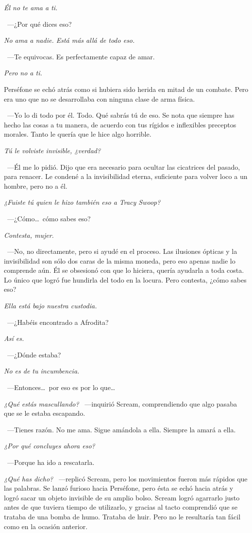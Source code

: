 \emph{Él no te ama a ti.}

~---¿Por qué dices eso?

\emph{No ama a nadie. Está más allá de todo eso.}

~---Te equivocas. Es perfectamente capaz de amar.

\emph{Pero no a ti.}

Perséfone se echó atrás como si hubiera sido herida en mitad de un combate. Pero era uno que no se desarrollaba con ninguna clase de arma física.

~---Yo lo di todo por él. Todo. Qué sabrás tú de eso. Se nota que siempre has hecho las cosas a tu manera, de acuerdo con tus rígidos e inflexibles preceptos morales. Tanto le quería que le hice algo horrible.

\emph{Tú le volviste invisible, ¿verdad?}

~---Él me lo pidió. Dijo que era necesario para ocultar las cicatrices del pasado, para renacer. Le condené a la invisibilidad eterna, suficiente para volver loco a un hombre, pero no a él.

\emph{¿Fuiste tú quien le hizo también eso a Tracy Swoop?}

~---¿Cómo\dots\ cómo sabes eso?

\emph{Contesta, mujer.}

~---No, no directamente, pero si ayudé en el proceso. Las ilusiones ópticas y la invisibilidad son sólo dos caras de la misma moneda, pero eso apenas nadie lo comprende aún. Él se obsesionó con que lo hiciera, quería ayudarla a toda costa. Lo único que logró fue hundirla del todo en la locura. Pero contesta, ¿cómo sabes eso?

\emph{Ella está bajo nuestra custodia.}

~---¿Habéis encontrado a Afrodita?

\emph{Así es.}

~---¿Dónde estaba?

\emph{No es de tu incumbencia.}

~---Entonces\dots\ por eso es por lo que\dots

\emph{¿Qué estás mascullando?} ~---inquirió Scream, comprendiendo que algo pasaba que se le estaba escapando.

~---Tienes razón. No me ama. Sigue amándola a ella. Siempre la amará a ella.

\emph{¿Por qué concluyes ahora eso?}

~---Porque ha ido a rescatarla.

\emph{¿Qué has dicho?} ~---replicó Scream, pero los movimientos fueron más rápidos que las palabras. Se lanzó furioso hacia Perséfone, pero ésta se echó hacia atrás y logró sacar un objeto invisible de su amplio bolso. Scream logró agarrarlo justo antes de que tuviera tiempo de utilizarlo, y gracias al tacto comprendió que se trataba de una bomba de humo. Trataba de huir. Pero no le resultaría tan fácil como en la ocasión anterior.

